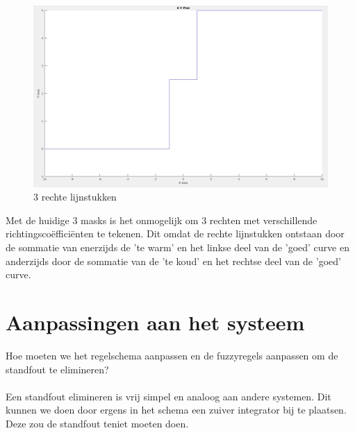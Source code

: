 \documentclass[a4paper, 12pt]{article}
\begin{document}
\newpage

\begin{table}[!h]
\centering
{}
\end{table}

\begin{figure}[!h]
	\includegraphics[width=1\linewidth]{Labo4_1_rechte.jpg}
	\caption{3 rechte lijnstukken}
\end{figure}
\noindent
Met de huidige 3 masks is het onmogelijk om 3 rechten met verschillende richtingscoëfficiënten te tekenen. Dit omdat de rechte lijnstukken ontstaan door de sommatie van enerzijds de 'te warm' en het linkse deel van de 'goed' curve en anderzijds door de sommatie van de 'te koud' en het rechtse deel van de 'goed' curve.
\newpage

\section{Aanpassingen aan het systeem}

Hoe moeten we het regelschema aanpassen en de fuzzyregels aanpassen om de standfout te elimineren? \\ \\
Een standfout elimineren is vrij simpel en analoog aan andere systemen. Dit kunnen we doen door ergens in het schema een zuiver integrator bij te plaatsen. Deze zou de standfout teniet moeten doen. 
\end{document}
